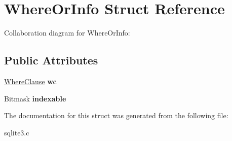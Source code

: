 \hypertarget{structWhereOrInfo}{}\section{Where\+Or\+Info Struct Reference}
\label{structWhereOrInfo}


Collaboration diagram for Where\+Or\+Info\+:
\subsection*{Public Attributes}
\begin{DoxyCompactItemize}
\item 
\hyperlink{structWhereClause}{Where\+Clause} {\bfseries wc}\hypertarget{structWhereOrInfo_a45bb04e5ea24ec549f060bc8b210ec71}{}\label{structWhereOrInfo_a45bb04e5ea24ec549f060bc8b210ec71}

\item 
Bitmask {\bfseries indexable}\hypertarget{structWhereOrInfo_a39777f291e1e516f01b05b71a9805357}{}\label{structWhereOrInfo_a39777f291e1e516f01b05b71a9805357}

\end{DoxyCompactItemize}


The documentation for this struct was generated from the following file\+:\begin{DoxyCompactItemize}
\item 
sqlite3.\+c\end{DoxyCompactItemize}
